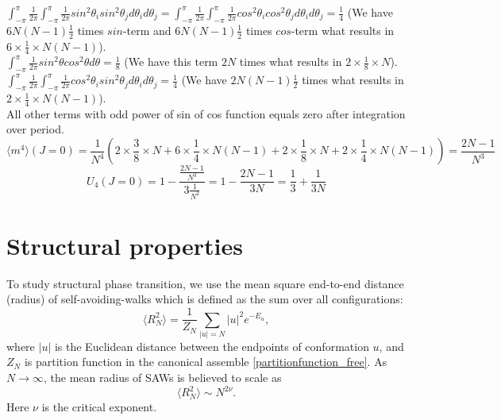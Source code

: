 $ \int_{-\pi}^{\pi}  \frac{1}{2 \pi}\int_{-\pi}^{\pi} \frac{1}{2 \pi} sin^2 \theta_i sin^2 \theta_j d\theta_i  d\theta_j = \int_{-\pi}^{\pi}  \frac{1}{2 \pi}\int_{-\pi}^{\pi} \frac{1}{2 \pi} cos^2 \theta_i cos^2 \theta_j d\theta_i  d\theta_j = \frac{1}{4}$ (We  have $6N(N-1)\frac{1}{2}$ times $sin$-term and $6N(N-1)\frac{1}{2}$ times $cos$-term  what results in $6\times \frac{1}{4} \times N(N-1)$). \\

$ \int_{-\pi}^{\pi}  \frac{1}{2 \pi} sin^2 \theta cos^2 \theta d \theta  = \frac{1}{8}$ (We  have this term $2N$ times  what results in $2\times \frac{1}{8} \times N$). \\

$ \int_{-\pi}^{\pi}  \frac{1}{2 \pi}\int_{-\pi}^{\pi} \frac{1}{2 \pi} cos^2 \theta_i sin^2 \theta_j d\theta_i  d\theta_j = \frac{1}{4}$ (We  have $2N(N-1)\frac{1}{2}$ times  what results in $2\times \frac{1}{4} \times N(N-1)$). \\

All other terms with odd power of sin of cos function equals zero after integration over period. 
\begin{equation*}
\langle m^4 \rangle (J=0) = \frac{1}{N^4} \left( 2\times \frac{3}{8} \times N + 6\times \frac{1}{4} \times N(N-1) + 2\times \frac{1}{8} \times N + 2\times \frac{1}{4} \times N(N-1)
\right) = \frac{2N-1}{N^3}  
\end{equation*}
\begin{equation}
\label{binderqum_0}
U_4 (J=0) = 1 - \frac{  \frac{2N-1}{N^3} }{3  \frac{1}{N^2} } = 1 - 
\frac{2N-1}{3N} = \frac{1}{3} + \frac{1}{3N} 
\end{equation}
 
\section{Structural properties} 
To study structural phase transition, we use the mean square end-to-end distance (radius) of self-avoiding-walks which is defined as the sum over all configurations:
\begin{equation}
\label{endtoend}
\langle R_N^2 \rangle  =  \frac{1}{Z_N} \sum_{ |u|=N }  |u|^2 e^{-E_u},
\end{equation}
where $|u|$ is the Euclidean distance between the endpoints of conformation $u$, and $Z_N$ is partition function in the canonical assemble \eqref{partitionfunction_free}. As $N \rightarrow \infty $, the mean radius  of SAWs is believed to scale as 
\begin{equation}
\label{r_scale}
\langle R_N^2 \rangle \sim N^{2 \nu }.
\end{equation}
Here ${\nu} $ is the critical exponent. 

